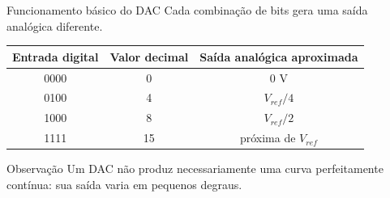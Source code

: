 \begin{frame}{Funcionamento básico do DAC}
    Cada combinação de bits gera uma saída analógica diferente.

    \begin{table}
        \centering
        \begin{tabular}{ccc}
            \toprule
            Entrada digital & Valor decimal & Saída analógica aproximada \\
            \midrule
            0000 & 0  & 0 V \\
            0100 & 4  & $V_{ref}/4$ \\
            1000 & 8  & $V_{ref}/2$ \\
            1111 & 15 & próxima de $V_{ref}$ \\
            \bottomrule
        \end{tabular}
    \end{table}

    \begin{block}{Observação}
        Um DAC não produz necessariamente uma curva perfeitamente contínua:
        sua saída varia em pequenos degraus.
    \end{block}
\end{frame}